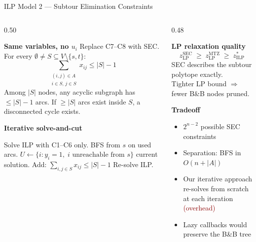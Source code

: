 \documentclass{beamer}
\begin{document}
\begin{frame}{ILP Model 2 --- Subtour Elimination Constraints}

\begin{columns}[T]
\begin{column}{0.50\textwidth}
\begin{block}{\textbf{Same variables, no $u_i$}}
\small
Replace C7--C8 with SEC.\\
For every $\emptyset \neq S \subseteq V\setminus\{s,t\}$:
$$\sum_{\substack{(i,j)\in A\\i\in S,\,j\in S}} x_{ij} \leq |S|-1$$
Among $|S|$ nodes, any acyclic subgraph has $\leq |S|-1$ arcs.
If $\geq |S|$ arcs exist inside $S$, a disconnected cycle exists.
\end{block}

\vspace{4pt}

\begin{block}{\textbf{Iterative solve-and-cut}}
\footnotesize
\begin{algorithmic}[1]
\State Solve ILP with C1--C6 only.
\Repeat
  \State BFS from $s$ on used arcs.
  \State $U \leftarrow \{i : y_i=1,\; i \text{ unreachable from } s\}$
   \State \Return current solution. \EndIf
    \State Add: $\sum_{i,j\in S} x_{ij} \leq |S|-1$
  \EndFor
  \State Re-solve ILP.
\end{algorithmic}
\end{block}
\end{column}

\begin{column}{0.48\textwidth}
\begin{block}{\textbf{LP relaxation quality}}
\small
$$z_{\mathrm{LP}}^{\mathrm{SEC}} \;\geq\; z_{\mathrm{LP}}^{\mathrm{MTZ}} \;\geq\; z_{\mathrm{ILP}}^*$$
SEC describes the subtour polytope exactly.\\[4pt]
Tighter LP bound $\Rightarrow$ fewer B\&B nodes pruned.
\end{block}

\vspace{4pt}

\begin{block}{\textbf{Tradeoff}}
\small
\begin{itemize}\setlength\itemsep{2pt}
  \item $2^{n-2}$ possible SEC constraints
  \item Separation: BFS in $O(n+|A|)$
  \item Our iterative approach re-solves from scratch at each iteration \textcolor{darkred}{(overhead)}
  \item Lazy callbacks would preserve the B\&B tree
\end{itemize}
\end{block}
\end{column}
\end{columns}

\end{frame}
\end{document}
